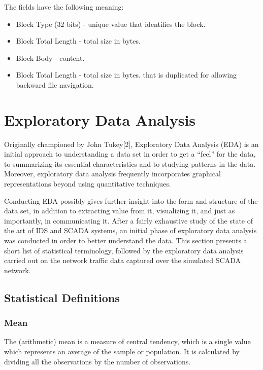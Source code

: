 \documentclass[12pt,]{article}
\begin{document}
The fields have the following meaning:

\begin{itemize}
\itemsep1pt\parskip0pt
\item
  Block Type (32 bits) - unique value that identifies the block.
\item
  Block Total Length - total size in bytes.
\item
  Block Body - content.
\item
  Block Total Length - total size in bytes. that is duplicated for
  allowing backward file navigation.
\end{itemize}

\pagebreak

\section{Exploratory Data Analysis}\label{exploratory-data-analysis}

Originally championed by John Tukey{[}2{]}, Exploratory Data Analysis
(EDA) is an initial approach to understanding a data set in order to get
a ``feel'' for the data, to summarizing its essential characteristics
and to studying patterns in the data. Moreover, exploratory data
analysis frequently incorporates graphical representations beyond using
quantitative techniques.

Conducting EDA possibly gives further insight into the form and
structure of the data set, in addition to extracting value from it,
visualizing it, and just as importantly, in communicating it. After a
fairly exhaustive study of the state of the art of IDS and SCADA
systems, an initial phase of exploratory data analysis was conducted in
order to better understand the data. This section presents a short list
of statistical terminology, followed by the exploratory data analysis
carried out on the network traffic data captured over the simulated
SCADA network.

\subsection{Statistical Definitions}\label{statistical-definitions}

\subsubsection{Mean}\label{mean}

The (arithmetic) mean is a measure of central tendency, which is a
single value which represents an average of the sample or population. It
is calculated by dividing all the observations by the number of
observations.
\end{document}
